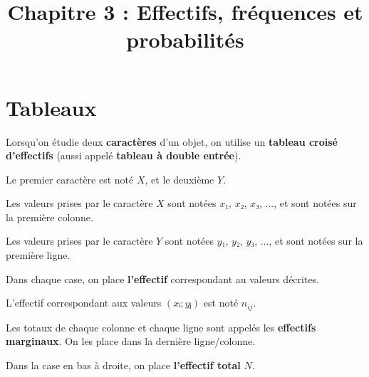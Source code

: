 \documentclass[
	classe=$1^{ere} STI2D$,
	headerTitle=Cours\space Chapitre\space 3
]{coursclass}
\title{Chapitre 3 : Effectifs, fréquences et probabilités}
\date{}
\author{}
\begin{document}
\maketitle

\section{Tableaux}

\begin{definition}
	Lorsqu'on étudie deux \textbf{caractères} d'un objet, on utilise un \textbf{tableau croisé d'effectifs} (aussi appelé \textbf{tableau à double entrée}).

	Le premier caractère est noté $X$, et le deuxième $Y$. \medskip

	Les valeurs prises par le caractère $X$ sont notées $x₁$, $x₂$, $x₃$, ..., et sont notées sur la première colonne.

	Les valeurs prises par le caractère $Y$ sont notées $y₁$, $y₂$, $y₃$, ..., et sont notées sur la première ligne. \medskip

	Dans chaque case, on place \textbf{l'effectif} correspondant au valeurs décrites.

	L'effectif correspondant aux valeurs $(xᵢ ; yⱼ)$ est noté $n_{ij}$.

	Les totaux de chaque colonne et chaque ligne sont appelés les \textbf{effectifs marginaux}. On les place dans la dernière ligne/colonne.

	Dans la case en bas à droite, on place \textbf{l'effectif total} $N$.
\end{definition}
\end{document}
